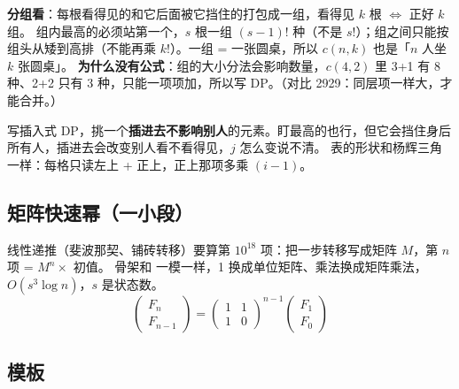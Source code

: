 \textbf{分组看}：每根看得见的和它后面被它挡住的打包成一组，看得见 $k$ 根 $\Leftrightarrow$ 正好 $k$ 组。
组内最高的必须站第一个，$s$ 根一组 $(s-1)!$ 种（不是 $s!$）；组之间只能按组头从矮到高排（不能再乘 $k!$）。一组 = 一张圆桌，所以 $c(n,k)$ 也是「$n$ 人坐 $k$ 张圆桌」。
\textbf{为什么没有公式}：组的大小分法会影响数量，$c(4,2)$ 里 3+1 有 8 种、2+2 只有 3 种，只能一项项加，所以写 DP。（对比 2929：同层项一样大，才能合并。）

\begin{principle}
写插入式 DP，挑一个\textbf{插进去不影响别人}的元素。盯最高的也行，但它会挡住身后所有人，插进去会改变别人看不看得见，$j$ 怎么变说不清。
表的形状和杨辉三角一样：每格只读左上 + 正上，正上那项多乘 $(i-1)$。
\end{principle}

\subsection{矩阵快速幂（一小段）}

线性递推（斐波那契、铺砖转移）要算第 $10^{18}$ 项：把一步转移写成矩阵 $M$，第 $n$ 项 = $M^n \times$ 初值。
骨架和  一模一样，1 换成单位矩阵、乘法换成矩阵乘法，$O(s^3 \log n)$，$s$ 是状态数。
\[
\begin{pmatrix} F_n \\ F_{n-1} \end{pmatrix} = \begin{pmatrix} 1 & 1 \\ 1 & 0 \end{pmatrix}^{n-1} \begin{pmatrix} F_1 \\ F_0 \end{pmatrix}
\]

\subsection{模板}

